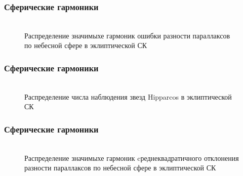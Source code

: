 \documentclass[12pt,aspectratio=43]{beamer}
\begin{document}
\begin{frame}
\frametitle{Сферические гармоники}
\begin{figure}[h!]
\\{Распределение значимыхе гармоник ошибки разности параллаксов по небесной сфере в эклиптической СК}
\end{figure}
\end{frame}	



\begin{frame}[<alignment>]
\frametitle{Сферические гармоники}
\begin{figure}[h!]
\\{Распределение числа наблюдения звезд Hipparcos в эклиптической СК}
\end{figure}
\end{frame}	

\begin{frame}
\frametitle{Сферические гармоники}
\begin{figure}[h!]
\center{\texttt{[image: sf\_j\_dd]}}\\{Распределение значимыхе гармоник cреднеквадратичного отклонения разности параллаксов по небесной сфере в эклиптической СК}
\end{figure}
\end{frame}	
\end{document}
